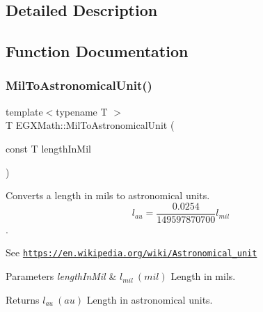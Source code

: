 \subsection{Detailed Description}


\subsection{Function Documentation}
\mbox{\label{group___e_g_x_math-_conversions-_length_conversions-_imperial-_mil-_astronomical_gaa7f4d37736c3265b5eb5ee9a16d91914}} 
\subsubsection{\texorpdfstring{Mil\+To\+Astronomical\+Unit()}{MilToAstronomicalUnit()}}
{\footnotesize\ttfamily template$<$typename T $>$ \\
T E\+G\+X\+Math\+::\+Mil\+To\+Astronomical\+Unit (\begin{DoxyParamCaption}\item[{const T}]{length\+In\+Mil }\end{DoxyParamCaption})}



Converts a length in mils to astronomical units. \[ l_{au}=\frac{0.0254}{149597870700} l_{mil} \]. 

See \href{https://en.wikipedia.org/wiki/Astronomical_unit}{\tt https\+://en.\+wikipedia.\+org/wiki/\+Astronomical\+\_\+unit} 
\begin{DoxyParams}{Parameters}
{\em length\+In\+Mil} & $ l_{mil}\ (mil)$ Length in mils. \\
\hline
\end{DoxyParams}
\begin{DoxyReturn}{Returns}
$ l_{au}\ (au)$ Length in astronomical units. 
\end{DoxyReturn}
\mbox{\label{group___e_g_x_math-_conversions-_length_conversions-_imperial-_mil-_astronomical_ga5f6040b0b1a9aca71dbdfe79fc257b35}} 
